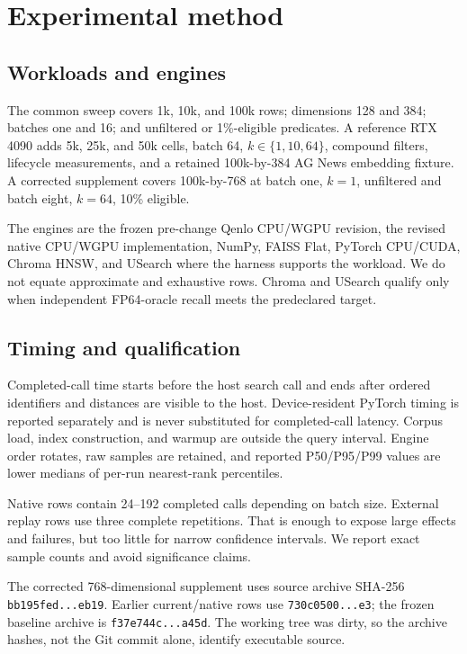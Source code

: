 \documentclass[10pt]{article}
\newcommand{\qenlo}{Qenlo}
\begin{document}
\section{Experimental method}
\subsection{Workloads and engines}
The common sweep covers 1k, 10k, and 100k rows; dimensions 128 and 384; batches one and 16; and unfiltered or 1\%-eligible predicates. A reference RTX 4090 adds 5k, 25k, and 50k cells, batch 64, \(k\in\{1,10,64\}\), compound filters, lifecycle measurements, and a retained 100k-by-384 AG News embedding fixture. A corrected supplement covers 100k-by-768 at batch one, \(k=1\), unfiltered and batch eight, \(k=64\), 10\% eligible.

The engines are the frozen pre-change \qenlo{} CPU/WGPU revision, the revised native CPU/WGPU implementation, NumPy, FAISS Flat, PyTorch CPU/CUDA, Chroma HNSW, and USearch where the harness supports the workload. We do not equate approximate and exhaustive rows. Chroma and USearch qualify only when independent FP64-oracle recall meets the predeclared target.

\subsection{Timing and qualification}
Completed-call time starts before the host search call and ends after ordered identifiers and distances are visible to the host. Device-resident PyTorch timing is reported separately and is never substituted for completed-call latency. Corpus load, index construction, and warmup are outside the query interval. Engine order rotates, raw samples are retained, and reported P50/P95/P99 values are lower medians of per-run nearest-rank percentiles.

Native rows contain 24--192 completed calls depending on batch size. External replay rows use three complete repetitions. That is enough to expose large effects and failures, but too little for narrow confidence intervals. We report exact sample counts and avoid significance claims.

The corrected 768-dimensional supplement uses source archive SHA-256 \texttt{bb195fed...eb19}. Earlier current/native rows use \texttt{730c0500...e3}; the frozen baseline archive is \texttt{f37e744c...a45d}. The working tree was dirty, so the archive hashes, not the Git commit alone, identify executable source.
\end{document}
